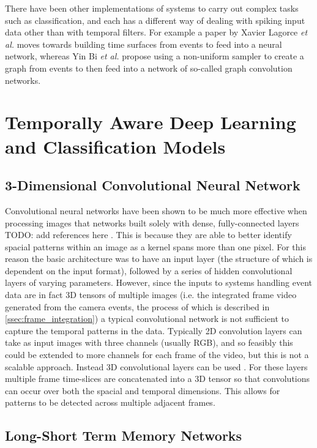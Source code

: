 There have been other implementations of systems to carry out complex tasks such as classification, and each has a different way of dealing with spiking input data other than with temporal filters. For example a paper by Xavier Lagorce \textit{et al.}\cite{eventsToTimeSurfaces} moves towards building time surfaces from events to feed into a neural network, whereas Yin Bi \textit{et al.}\cite{eventsToGraphs} propose using a non-uniform sampler to create a graph from events to then feed into a network of so-called graph convolution networks.

\section{Temporally Aware Deep Learning and Classification Models} \label{sec:temporally_aware_models}

\subsection{3-Dimensional Convolutional Neural Network} \label{ssec:3D_conv_network}

Convolutional neural networks have been shown to be much more effective when processing images that networks built solely with dense, fully-connected layers \color{red} TODO: add references here \color{black}. This is because they are able to better identify spacial patterns within an image as a kernel spans more than one pixel. For this reason the basic architecture was to have an input layer (the structure of which is dependent on the input format), followed by a series of hidden convolutional layers of varying parameters.
However, since the inputs to systems handling event data are in fact 3D tensors of multiple images (i.e. the integrated frame video generated from the camera events, the process of which is described in \cref{ssec:frame_integration}) a typical convolutional network is not sufficient to capture the temporal patterns in the data. Typically 2D convolution layers can take as input images with three channels (usually RGB), and so feasibly this could be extended to more channels for each frame of the video, but this is not a scalable approach. Instead 3D convolutional layers can be used \cite{3DConv}. For these layers multiple frame time-slices are concatenated into a 3D tensor so that convolutions can occur over both the spacial and temporal dimensions. This allows for patterns to be detected across multiple adjacent frames.

\subsection{Long-Short Term Memory Networks}

